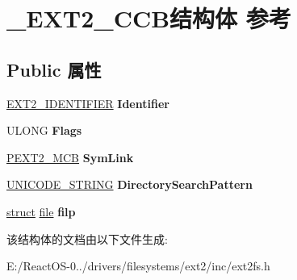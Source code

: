 \hypertarget{struct___e_x_t2___c_c_b}{}\section{\+\_\+\+E\+X\+T2\+\_\+\+C\+C\+B结构体 参考}
\label{struct___e_x_t2___c_c_b}
\subsection*{Public 属性}
\begin{DoxyCompactItemize}
\item 
\mbox{\label{struct___e_x_t2___c_c_b_ab86aaa9cdb6a4fcd6e6b6e1d6d640337}} 
\hyperlink{struct___e_x_t2___i_d_e_n_t_i_f_i_e_r}{E\+X\+T2\+\_\+\+I\+D\+E\+N\+T\+I\+F\+I\+ER} {\bfseries Identifier}
\item 
\mbox{\label{struct___e_x_t2___c_c_b_a02f58883264da72817dd284b647a39ff}} 
U\+L\+O\+NG {\bfseries Flags}
\item 
\mbox{\label{struct___e_x_t2___c_c_b_ab712e2985ca4e14169b84dd76191f62b}} 
\hyperlink{struct___e_x_t2___m_c_b}{P\+E\+X\+T2\+\_\+\+M\+CB} {\bfseries Sym\+Link}
\item 
\mbox{\label{struct___e_x_t2___c_c_b_a18365d1bff96282a91afe12df5b1298d}} 
\hyperlink{struct___u_n_i_c_o_d_e___s_t_r_i_n_g}{U\+N\+I\+C\+O\+D\+E\+\_\+\+S\+T\+R\+I\+NG} {\bfseries Directory\+Search\+Pattern}
\item 
\mbox{\label{struct___e_x_t2___c_c_b_afc209636eff4258aa083c77800e9e66b}} 
\hyperlink{interfacestruct}{struct} \hyperlink{structfile}{file} {\bfseries filp}
\end{DoxyCompactItemize}


该结构体的文档由以下文件生成\+:\begin{DoxyCompactItemize}
\item 
E\+:/\+React\+O\+S-\/0../drivers/filesystems/ext2/inc/ext2fs.\+h\end{DoxyCompactItemize}
